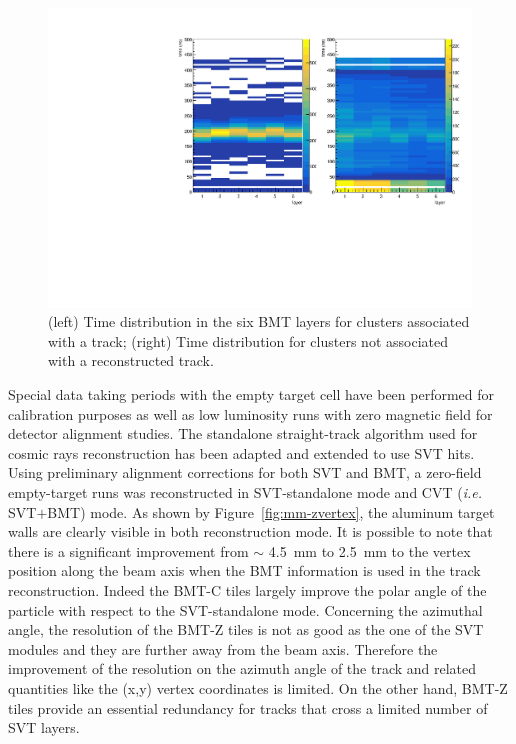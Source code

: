 \begin{figure}[htb]
 \includegraphics[width=\columnwidth,keepaspectratio]{images/align_cls_time.pdf}
 \caption{(left) Time distribution in the six BMT layers for clusters associated with a track; (right) Time distribution for clusters not associated with a reconstructed track.}
 \label{fig:mm-beam_cls_time}
\end{figure}


Special data taking periods with the empty target cell have been performed for calibration purposes as well as low luminosity runs with zero magnetic field for detector alignment studies. The standalone straight-track algorithm used for cosmic rays reconstruction has been adapted and extended to use SVT hits. Using preliminary alignment corrections for both SVT and BMT, a zero-field empty-target runs was reconstructed in SVT-standalone mode and CVT (\emph{i.e.} SVT$+$BMT) mode. As shown by Figure~\ref{fig:mm-zvertex}, the aluminum target walls are clearly visible in both reconstruction mode. It is possible to note that there is a significant improvement from $\sim$ 4.5~mm to 2.5~mm to the vertex position along the beam axis when the BMT information is used in the track reconstruction. Indeed the BMT-C tiles largely improve the polar angle of the particle with respect to the SVT-standalone mode. Concerning the azimuthal angle, the resolution of the BMT-Z tiles is not as good as the one of the SVT modules and they are further away from the beam axis. Therefore the improvement of the resolution on the azimuth angle of the track and related quantities like the (x,y) vertex coordinates is limited. On the other hand, BMT-Z tiles provide an essential redundancy for tracks that cross a limited number of SVT layers.

